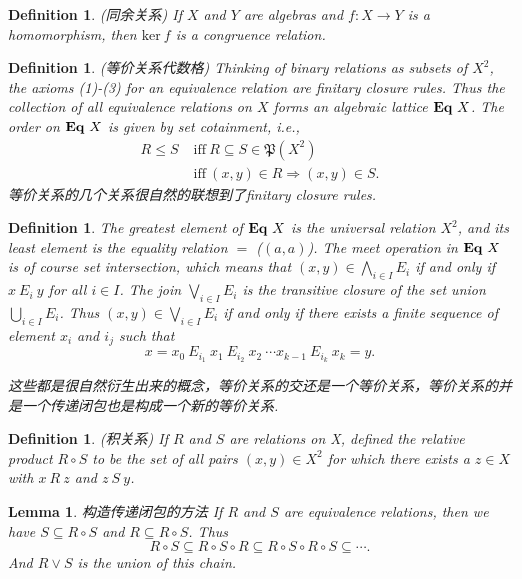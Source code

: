 \documentclass{article}
\newtheorem{lemma}[theorem]{Lemma}
\newtheorem{definition}[theorem]{Definition}
\newcommand*{\xfunc}[4]{{#2}\colon{#3}{#1}{#4}}
\newcommand*{\func}[3]{\xfunc{\to}{#1}{#2}{#3}}
\newcommand\eql[1]{\ensuremath\mathbf{Eq}~{#1}}
\begin{document}
\begin{definition}
\rm {\color{red}(同余关系)} If $X$ and $Y$ are algebras and $\func{f}{X}{Y}$ is a homomorphism, then $\text{ker}~f$ is a {\color{red} congruence relation}.
\end{definition}

\begin{definition}
\rm {\color{red}(等价关系代数格)} Thinking of binary relations as subsets of $X^2$, the axioms (1)-(3) for an equivalence relation are finitary closure rules. Thus the collection of all equivalence relations on $X$ forms an algebraic lattice $\eql{X}$. The order on $\eql{X}$ is given by set cotainment, i.e.,
$$
\begin{aligned}
R \leq S\;& \text{iff}~R \subseteq S \in \mathfrak{P}(X^2)\\
& \text{iff}~(x,y) \in R \Rightarrow (x,y) \in S.
\end{aligned}
$$
{\color{blue} 等价关系的几个关系很自然的联想到了finitary closure rules}.
\end{definition}

\begin{definition}
\rm The {\color{red} greatest element} of $\eql{X}$ is the universal relation $X^2$, and its {\color{red} least element} is the equality relation $=$ ($(a,a)$). The meet operation in $\eql{X}$ is of course set intersection, which means that $(x,y) \in \bigwedge\limits_{i \in I} E_i$ if and only if $x~E_i~y$ for all $i \in I$. The join $\bigvee\limits_{i \in I} E_i$ is the transitive closure of the set union $\bigcup\limits_{i \in I} E_i$. Thus $(x,y) \in \bigvee\limits_{i \in I} E_i$ if and only if there exists a finite sequence of element $x_i$ and $i_j$ such that 
$$
x = x_0~E_{i_1}~x_1~E_{i_2}~x_2~\cdots x_{k-1}~E_{i_k}~x_k = y.
$$

{\color{blue} 这些都是很自然衍生出来的概念，等价关系的交还是一个等价关系，等价关系的并是一个传递闭包也是构成一个新的等价关系}.
\end{definition}

\begin{definition}
\rm {\color{red}(积关系)} If $R$ and $S$ are relations on X, defined the relative product $R\circ S$ to be the set of all pairs $(x,y) \in X^2$ for which there exists a $z \in X$ with $x~R~z$ and $z~S~y$.
\end{definition}

\begin{lemma}
\rm {\color{red} 构造传递闭包的方法} If $R$ and $S$ are equivalence relations, then we have $S \subseteq R \circ S$ and $R \subseteq R \circ S$. Thus
$$
	R \circ S \subseteq R \circ S \circ R \subseteq R \circ  S \circ R \circ S \subseteq \cdots.
$$
And $R \vee S$ is the union of this chain.
\end{lemma}
\end{document}
